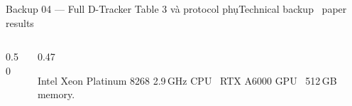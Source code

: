 \begin{frame}[shrink=24]{Backup 04 --- Full D-Tracker Table 3 và protocol phụ}{Technical backup \textperiodcentered\ paper results}
\begin{columns}[T,onlytextwidth]
\begin{column}{0.50\textwidth}
\begin{intuition}
\end{intuition}
\end{column}
\begin{column}{0.47\textwidth}
\begin{questioncard}
  \par
  Intel Xeon Platinum 8268 2.9\,GHz CPU \textperiodcentered\ RTX A6000 GPU \textperiodcentered\ 512\,GB memory.
\end{questioncard}
\end{column}
\end{columns}
\vspace{2mm}
\end{frame}
